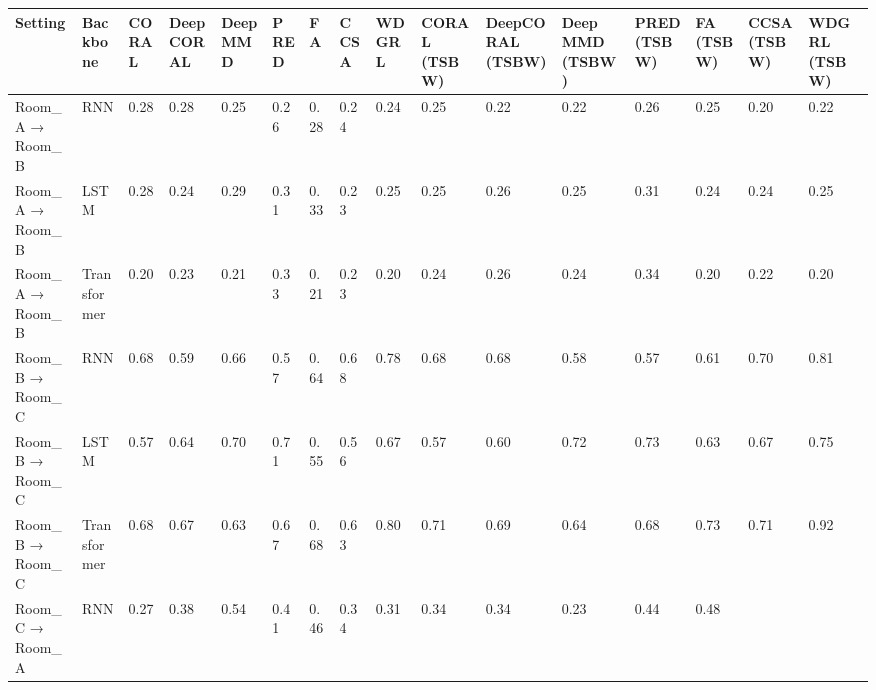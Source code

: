 \begin{tabular}{llllllllllllllll}
\toprule
Setting & Backbone & CORAL & DeepCORAL & Deep MMD & PRED & FA & CCSA & WDGRL & CORAL (TSBW) & DeepCORAL (TSBW) & Deep MMD (TSBW) & PRED (TSBW) & FA (TSBW) & CCSA (TSBW) & WDGRL (TSBW) \\
\midrule
Room_A → Room_B & RNN & 0.28 & 0.28 & 0.25 & 0.26 & 0.28 & 0.24 & 0.24 & 0.25 & 0.22 & 0.22 & 0.26 & 0.25 & 0.20 & 0.22 \\
Room_A → Room_B & LSTM & 0.28 & 0.24 & 0.29 & 0.31 & 0.33 & 0.23 & 0.25 & 0.25 & 0.26 & 0.25 & 0.31 & 0.24 & 0.24 & 0.25 \\
Room_A → Room_B & Transformer & 0.20 & 0.23 & 0.21 & 0.33 & 0.21 & 0.23 & 0.20 & 0.24 & 0.26 & 0.24 & 0.34 & 0.20 & 0.22 & 0.20 \\
Room_B → Room_C & RNN & 0.68 & 0.59 & 0.66 & 0.57 & 0.64 & 0.68 & 0.78 & 0.68 & 0.68 & 0.58 & 0.57 & 0.61 & 0.70 & 0.81 \\
Room_B → Room_C & LSTM & 0.57 & 0.64 & 0.70 & 0.71 & 0.55 & 0.56 & 0.67 & 0.57 & 0.60 & 0.72 & 0.73 & 0.63 & 0.67 & 0.75 \\
Room_B → Room_C & Transformer & 0.68 & 0.67 & 0.63 & 0.67 & 0.68 & 0.63 & 0.80 & 0.71 & 0.69 & 0.64 & 0.68 & 0.73 & 0.71 & 0.92 \\
Room_C → Room_A & RNN & 0.27 & 0.38 & 0.54 & 0.41 & 0.46 & 0.34 & 0.31 & 0.34 & 0.34 & 0.23 & 0.44 & 0.48 &  &  \\
\bottomrule
\end{tabular}
